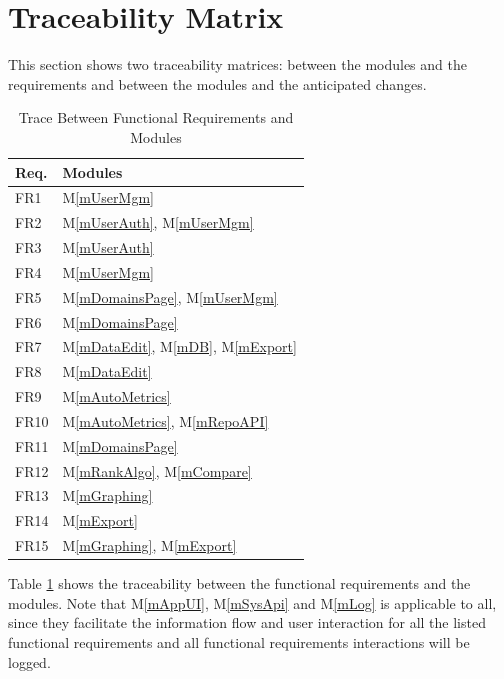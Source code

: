 \documentclass[12pt, titlepage]{article}
\newcommand{\mref}[1]{M\ref{#1}}
\begin{document}
\section{Traceability Matrix} \label{SecTM}

This section shows two traceability matrices: between the modules and the
requirements and between the modules and the anticipated changes.
\begin{table}[H]
\centering
\begin{tabular}{p{} p{}}
\toprule
\textbf{Req.} & \textbf{Modules}\\
\midrule
FR1 & \mref{mUserMgm}\\
FR2 & \mref{mUserAuth}, \mref{mUserMgm}\\
FR3 & \mref{mUserAuth}\\
FR4 & \mref{mUserMgm}\\
FR5 & \mref{mDomainsPage}, \mref{mUserMgm} \\
FR6 & \mref{mDomainsPage} \\
FR7 & \mref{mDataEdit}, \mref{mDB}, \mref{mExport} \\
FR8 & \mref{mDataEdit} \\
FR9 & \mref{mAutoMetrics} \\
FR10 & \mref{mAutoMetrics}, \mref{mRepoAPI}\\
FR11 & \mref{mDomainsPage}\\
FR12 & \mref{mRankAlgo}, \mref{mCompare}\\
FR13 & \mref{mGraphing}\\
FR14 & \mref{mExport}\\
FR15 & \mref{mGraphing}, \mref{mExport}\\
\bottomrule
\end{tabular}
\caption{Trace Between Functional Requirements and Modules}
\label{tb_fr_modules}
\end{table}

Table \ref{tb_fr_modules} shows the traceability between the functional requirements and the modules.
Note that \mref{mAppUI}, \mref{mSysApi} and \mref{mLog} is applicable to all, since they facilitate the information flow and user interaction for all the listed functional requirements and all functional requirements interactions will be logged.
\end{document}
